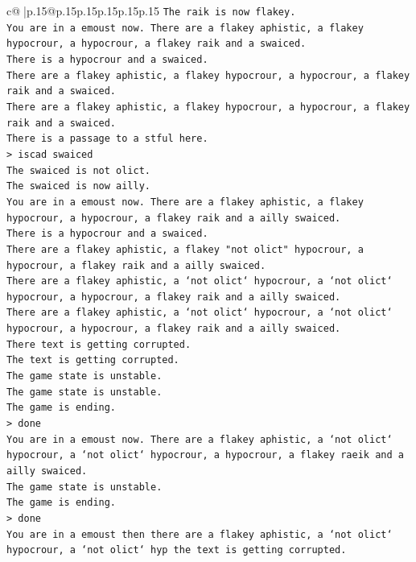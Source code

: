 \documentclass{article}
\begin{document}
{\begin{supertabular}{c@{$\;$}|p{.15\linewidth}@{}p{.15\linewidth}p{.15\linewidth}p{.15\linewidth}p{.15\linewidth}p{.15\linewidth}}
{{{\texttt{The raik is now flakey.} \\
\texttt{You are in a emoust now. There are a flakey aphistic, a flakey hypocrour, a hypocrour, a flakey raik and a swaiced.} \\
\texttt{There is a hypocrour and a swaiced.} \\
\texttt{There are a flakey aphistic, a flakey hypocrour, a hypocrour, a flakey raik and a swaiced.} \\
\texttt{There are a flakey aphistic, a flakey hypocrour, a hypocrour, a flakey raik and a swaiced.} \\
\texttt{There is a passage to a stful here.} \\
\texttt{> iscad swaiced} \\
\texttt{The swaiced is not olict.} \\
\texttt{The swaiced is now ailly.} \\
\texttt{You are in a emoust now. There are a flakey aphistic, a flakey hypocrour, a hypocrour, a flakey raik and a ailly swaiced.} \\
\texttt{There is a hypocrour and a swaiced.} \\
\texttt{There are a flakey aphistic, a flakey "not olict" hypocrour, a hypocrour, a flakey raik and a ailly swaiced.} \\
\texttt{There are a flakey aphistic, a `not olict` hypocrour, a `not olict` hypocrour, a hypocrour, a flakey raik and a ailly swaiced.} \\
\texttt{There are a flakey aphistic, a `not olict` hypocrour, a `not olict` hypocrour, a hypocrour, a flakey raik and a ailly swaiced.} \\
\texttt{There text is getting corrupted.} \\
\texttt{The text is getting corrupted.} \\
\texttt{The game state is unstable.} \\
\texttt{The game state is unstable.} \\
\texttt{The game is ending.} \\
\texttt{> done} \\
\texttt{You are in a emoust now. There are a flakey aphistic, a `not olict` hypocrour, a `not olict` hypocrour, a hypocrour, a flakey raeik and a ailly swaiced.} \\
\texttt{The game state is unstable.} \\
\texttt{The game is ending.} \\
\texttt{> done} \\
\texttt{You are in a emoust then there are a flakey aphistic, a `not olict` hypocrour, a `not olict` hyp the text is getting corrupted.} \\
}}}
\end{supertabular}}
\end{document}
